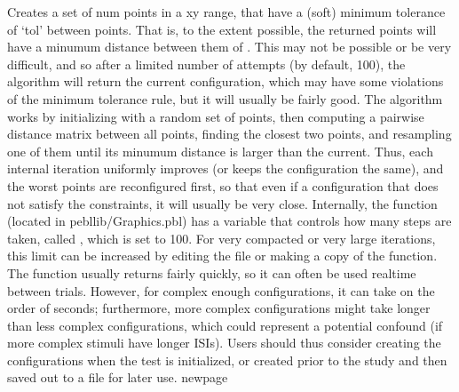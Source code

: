 \documentclass[letterpaper,10pt,english]{sphinxmanual}
\begin{document}
\sphinxAtStartPar
{}

\sphinxAtStartPar
Creates a set of num points in a xy range, that have a (soft) minimum tolerance of ‘tol’ between points.  That is, to the extent possible, the returned points will have a minumum distance between them of .  This may not be possible or be very difficult, and so after a limited number of attempts (by default, 100), the algorithm will return the current configuration, which may have some violations of the minimum tolerance rule, but it will usually be fairly good.    The algorithm works by initializing with a random set of points, then computing a pairwise distance matrix between all points, finding the closest two points, and resampling one of them until its minumum distance is larger than the current.  Thus, each internal iteration uniformly improves (or keeps the configuration the same), and the worst points are reconfigured first, so that even if a configuration that does not satisfy the constraints, it will usually be very close.  Internally, the function (located in pebl\sphinxhyphen{}lib/Graphics.pbl) has a variable that controls how many steps are taken, called , which is set to 100.  For very compacted or very large iterations, this limit can be increased by editing the file or making a copy of the function.    The function usually returns fairly quickly, so it can often be used real\sphinxhyphen{}time between trials.  However, for complex enough configurations, it can take on the order of seconds; furthermore, more  complex configurations might take longer than less complex configurations, which could represent a potential confound (if more complex stimuli have longer ISIs).  Users should thus consider creating the configurations when the test is initialized, or created prior to the study and then saved out to a file for later use.   newpage

\sphinxAtStartPar
{}

\begin{sphinxVerbatim}[commandchars=\\\{\}]
\end{sphinxVerbatim}

\sphinxAtStartPar
{}
\end{document}
